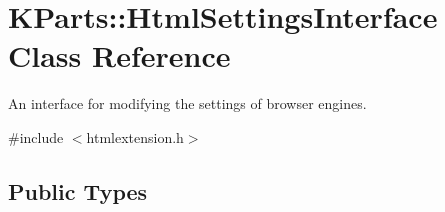 \hypertarget{classKParts_1_1HtmlSettingsInterface}{\section{\-K\-Parts\-:\-:\-Html\-Settings\-Interface \-Class \-Reference}
\label{classKParts_1_1HtmlSettingsInterface}
}


\-An interface for modifying the settings of browser engines.  




{\ttfamily \#include $<$htmlextension.\-h$>$}

\subsection*{\-Public \-Types}
